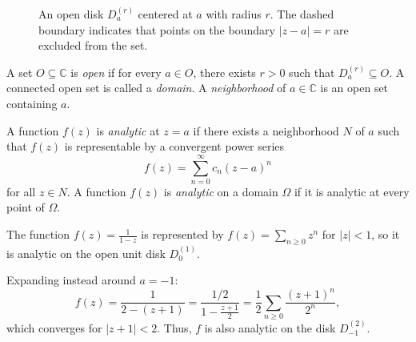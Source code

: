 \begin{figure}[htbp]
    \centering
    \caption{An open disk \(D_a^{(r)}\) centered at \(a\) with radius \(r\). The dashed boundary indicates that points on the boundary \(|z - a| = r\) are excluded from the set.}
\end{figure}

\begin{definition}
A set \(O \subseteq \mathbb{C}\) is \emph{open} if for every \(a \in O\), there exists \(r > 0\) such that \(D_a^{(r)} \subseteq O\).
A connected open set is called a \emph{domain}.
A \emph{neighborhood} of \(a \in \mathbb{C}\) is an open set containing \(a\).
\end{definition}

\begin{definition}
A function \(f(z)\) is \emph{analytic} at \(z = a\) if there exists a neighborhood \(N\) of \(a\) such that \(f(z)\) is representable by a convergent power series
\[
    f(z) = \sum_{n=0}^{\infty} c_n (z - a)^n
\]
for all \(z \in N\).
A function \(f(z)\) is \emph{analytic} on a domain \(\Omega\) if it is analytic at every point of \(\Omega\).
\end{definition}

\begin{example}
    The function \(f(z) = \frac{1}{1-z}\) is represented by \(f(z) = \sum_{n \ge 0} z^n\) for \(|z| < 1\), so it is analytic on the open unit disk \(D_0^{(1)}\).

    Expanding instead around \(a = -1\):
    \[
        f(z) = \frac{1}{2 - (z + 1)} = \frac{1/2}{1 - \frac{z + 1}{2}} = \frac{1}{2} \sum_{n \ge 0} \frac{(z + 1)^n}{2^n},
    \]
    which converges for \(|z + 1| < 2\). Thus, \(f\) is also analytic on the disk \(D_{-1}^{(2)}\).
\end{example}

